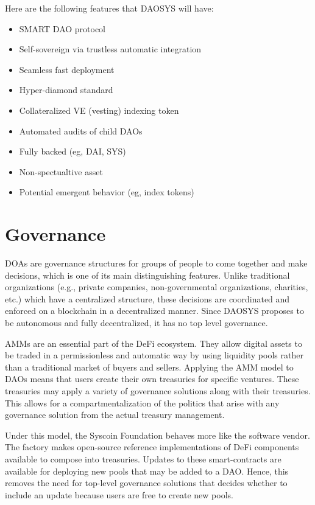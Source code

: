 \documentclass[journal,twocolumn,12pt]{ieeesyscoin}
\begin{document}
Here are the following features that DAOSYS will have:

\begin{itemize}
  \item SMART DAO protocol
  \item Self-sovereign via trustless automatic integration
  \item Seamless fast deployment
  \item Hyper-diamond standard
  \item Collateralized VE (vesting) indexing token
  \item Automated audits of child DAOs
  \item Fully backed (eg, DAI, SYS)
  \item Non-spectualtive asset
  \item Potential emergent behavior (eg, index tokens)
\end{itemize}  

\section{Governance}
\label{sec:governance}

DOAs are governance structures for groups of people to come together and make decisions, which is one of its main distinguishing features. Unlike traditional organizations (e.g., private companies, non-governmental organizations, charities, etc.) which have a centralized structure, these decisions are coordinated and enforced on a blockchain in a decentralized manner. Since DAOSYS proposes to be autonomous and fully decentralized, it has no top level governance.

AMMs are an essential part of the DeFi ecosystem. They allow digital assets to be traded in a permissionless and automatic way by using liquidity pools rather than a traditional market of buyers and sellers. Applying the AMM model to DAOs means that users create their own treasuries for specific ventures. These treasuries may apply a variety of governance solutions along with their treasuries. This allows for a compartmentalization of the politics that arise with any governance solution from the actual treasury management.

Under this model, the Syscoin Foundation behaves more like the software vendor. The factory makes open-source reference implementations of DeFi components available to compose into treasuries. Updates to these smart-contracts are available for deploying new pools that may be added to a DAO. Hence, this removes the need for top-level governance solutions that decides whether to include an update because users are free to create new pools.
\end{document}
